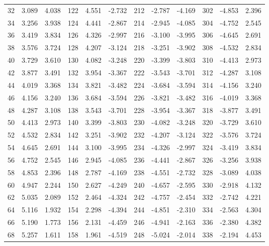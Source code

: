 \begin{table}
{\begin{tabular}{rrr|rrr|rrr|rrr}
 32 &   3.089 &  4.038 & 122 &   4.551 & -2.732 & 212 &  -2.787 & -4.169 & 302 &  -4.853 &  2.396\\
 34 &   3.256 &  3.938 & 124 &   4.441 & -2.867 & 214 &  -2.945 & -4.085 & 304 &  -4.752 &  2.545\\
 36 &   3.419 &  3.834 & 126 &   4.326 & -2.997 & 216 &  -3.100 & -3.995 & 306 &  -4.645 &  2.691\\
 38 &   3.576 &  3.724 & 128 &   4.207 & -3.124 & 218 &  -3.251 & -3.902 & 308 &  -4.532 &  2.834\\
 40 &   3.729 &  3.610 & 130 &   4.082 & -3.248 & 220 &  -3.399 & -3.803 & 310 &  -4.413 &  2.973\\
 42 &   3.877 &  3.491 & 132 &   3.954 & -3.367 & 222 &  -3.543 & -3.701 & 312 &  -4.287 &  3.108\\
 44 &   4.019 &  3.368 & 134 &   3.821 & -3.482 & 224 &  -3.684 & -3.594 & 314 &  -4.156 &  3.240\\
 46 &   4.156 &  3.240 & 136 &   3.684 & -3.594 & 226 &  -3.821 & -3.482 & 316 &  -4.019 &  3.368\\
 48 &   4.287 &  3.108 & 138 &   3.543 & -3.701 & 228 &  -3.954 & -3.367 & 318 &  -3.877 &  3.491\\
 50 &   4.413 &  2.973 & 140 &   3.399 & -3.803 & 230 &  -4.082 & -3.248 & 320 &  -3.729 &  3.610\\
 52 &   4.532 &  2.834 & 142 &   3.251 & -3.902 & 232 &  -4.207 & -3.124 & 322 &  -3.576 &  3.724\\
 54 &   4.645 &  2.691 & 144 &   3.100 & -3.995 & 234 &  -4.326 & -2.997 & 324 &  -3.419 &  3.834\\
 56 &   4.752 &  2.545 & 146 &   2.945 & -4.085 & 236 &  -4.441 & -2.867 & 326 &  -3.256 &  3.938\\
 58 &   4.853 &  2.396 & 148 &   2.787 & -4.169 & 238 &  -4.551 & -2.732 & 328 &  -3.089 &  4.038\\
 60 &   4.947 &  2.244 & 150 &   2.627 & -4.249 & 240 &  -4.657 & -2.595 & 330 &  -2.918 &  4.132\\
 62 &   5.035 &  2.089 & 152 &   2.464 & -4.324 & 242 &  -4.757 & -2.454 & 332 &  -2.742 &  4.221\\
 64 &   5.116 &  1.932 & 154 &   2.298 & -4.394 & 244 &  -4.851 & -2.310 & 334 &  -2.563 &  4.304\\
 66 &   5.190 &  1.773 & 156 &   2.131 & -4.459 & 246 &  -4.941 & -2.163 & 336 &  -2.380 &  4.382\\
 68 &   5.257 &  1.611 & 158 &   1.961 & -4.519 & 248 &  -5.024 & -2.014 & 338 &  -2.194 &  4.453\\

\end{tabular}}
\end{table}
